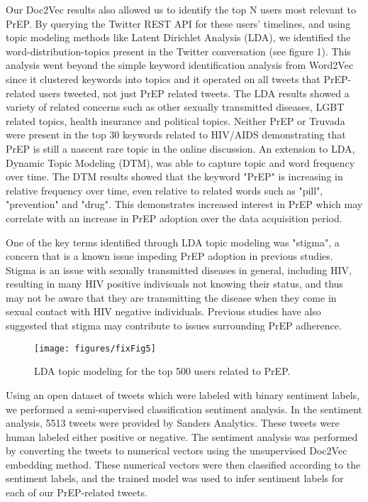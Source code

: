 Our Doc2Vec results also allowed us to identify the top N users most relevant to PrEP. By querying the Twitter REST API for these users' timelines, and using topic modeling methods like Latent Dirichlet Analysis (LDA), we identified the word-distribution-topics present in the Twitter conversation (see figure 1). This analysis went beyond the simple keyword identification analysis from Word2Vec since it clustered keywords into topics and it operated on all tweets that PrEP-related users tweeted, not just PrEP related tweets. The LDA results showed a variety of related concerns such as other sexually transmitted diseases, LGBT related topics, health insurance and political topics. Neither PrEP or Truvada were present in the top 30 keywords related to HIV/AIDS demonstrating that PrEP is still a nascent rare topic in the online discussion. An extension to LDA, Dynamic Topic Modeling (DTM), was able to capture topic and word frequency over time. The DTM results showed that the keyword "PrEP" is increasing in relative frequency over time, even relative to related words such as "pill", "prevention" and "drug". This demonstrates increased interest in PrEP which may correlate with an increase in PrEP adoption over the data acquisition period.

One of the key terms identified through LDA topic modeling was "stigma", a concern that is a known issue impeding PrEP adoption in previous studies\cite{liu2014early}. Stigma is an issue with sexually transmitted diseases in general, including HIV, resulting in many HIV positive indivisuals not knowing their status, and thus may not be aware that they are transmitting the disease when they come in sexual contact with HIV negative individuals. Previous studies have also suggested that stigma may contribute to issues surrounding PrEP adherence\cite{calabrese2015stigma}.

\begin{figure*}
\centering
\texttt{[image: figures/fixFig5]}
\caption{LDA topic modeling for the top 500 users related to PrEP.}
\label{fig:lda}
\end{figure*}

Using an open dataset of tweets which were labeled with binary sentiment labels, we performed a semi-supervised classification sentiment analysis. In the sentiment analysis, 5513 tweets were provided by Sanders Analytics. These tweets were human labeled either positive or negative. The sentiment analysis was performed by converting the tweets to numerical vectors using the unsupervised Doc2Vec embedding method. These numerical vectors were then classified according to the sentiment labels, and the trained model was used to infer sentiment labels for each of our PrEP-related tweets.

